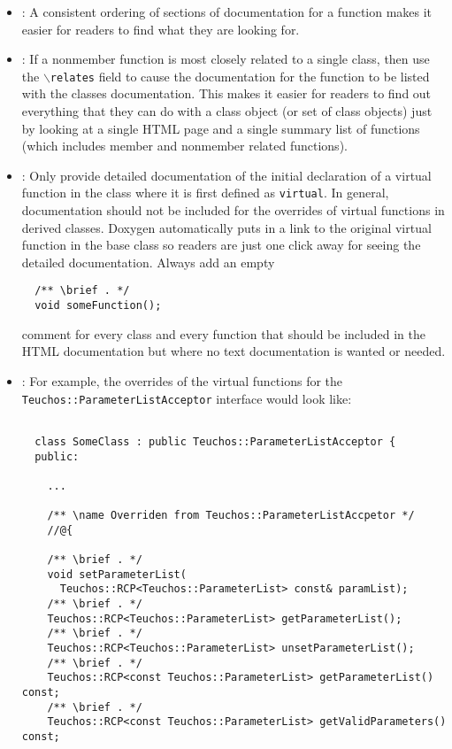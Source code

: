 \begin{itemize}
{}\item\DOXOrderOfDocFieds: A consistent ordering of sections of documentation
for a function makes it easier for readers to find what they are looking for.


{}\item\DOXUseRelatesForNonmemberFunctions: If a nonmember function is most
closely related to a single class, then use the {}\texttt{$\backslash$relates}
field to cause the documentation for the function to be listed with the
classes documentation.  This makes it easier for readers to find out
everything that they can do with a class object (or set of class objects) just
by looking at a single HTML page and a single summary list of functions (which
includes member and nonmember related functions).


{}\item\DOXDocumentInitialVirtualOnly: Only provide detailed documentation of
the initial declaration of a virtual function in the class where it is first
defined as {}\texttt{virtual}.  In general, documentation should not be
included for the overrides of virtual functions in derived classes.  Doxygen
automatically puts in a link to the original virtual function in the base
class so readers are just one click away for seeing the detailed
documentation.  Always add an empty
%
{\small\begin{verbatim}
  /** \brief . */
  void someFunction();
\end{verbatim}}
%
comment for every class and every function that should be included in the HTML
documentation but where no text documentation is wanted or needed.


{}\item\DOXAggregateOverrides: For example, the overrides of the virtual
functions for the {}\texttt{Teuchos\-::Parameter\-List\-Acceptor} interface
would look like:

{\small\begin{verbatim}

  class SomeClass : public Teuchos::ParameterListAcceptor {
  public:

    ...

    /** \name Overriden from Teuchos::ParameterListAccpetor */
    //@{

    /** \brief . */
    void setParameterList(
      Teuchos::RCP<Teuchos::ParameterList> const& paramList);
    /** \brief . */
    Teuchos::RCP<Teuchos::ParameterList> getParameterList();
    /** \brief . */
    Teuchos::RCP<Teuchos::ParameterList> unsetParameterList();
    /** \brief . */
    Teuchos::RCP<const Teuchos::ParameterList> getParameterList() const;
    /** \brief . */
    Teuchos::RCP<const Teuchos::ParameterList> getValidParameters() const;


\end{verbatim}}
\end{itemize}
